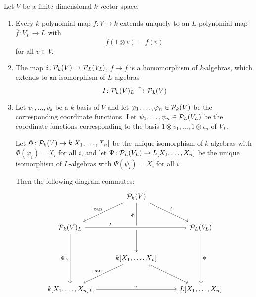 \begin{proposition}
  Let $V$ be a finite-dimensional $k$-vector space.
  \begin{enumerate}
    \item
      Every $k$-polynomial map $f \colon V \to k$ extends uniquely to an $L$-polynomial map $\overline{f} \colon V_L \to L$ with
      \[
          \overline{f}(1 \otimes v)
        = f(v)
      \]
      for all $v \in V$.
    \item
      The map $i \colon \mathcal{P}_k(V) \to \mathcal{P}_L(V_L)$, $f \mapsto \overline{f}$ is a homomorphism of $k$-algebras, which extends to an isomorphism of $L$-algebras
      \[
                            I
        \colon              \mathcal{P}_k(V)_L
        \xrightarrow{\sim}  \mathcal{P}_L(V)
      \]
    \item
      Let $v_1, \dotsc, v_n$ be a $k$-basis of $V$ and let $\varphi_1, \dotsc, \varphi_n \in \mathcal{P}_k(V)$ be the corresponding coordinate functions.
      Let $\psi_1, \dotsc, \psi_n \in \mathcal{P}_L(V_L)$ be the coordinate functions corresponding to the basis $1 \otimes v_1, \dotsc, 1 \otimes v_n$ of $V_L$.
      
      Let $\Phi \colon \mathcal{P}_k(V) \to k[X_1, \dotsc, X_n]$ be the unique isomorphism of $k$-algebras with $\Phi(\varphi_i) = X_i$ for all $i$, and let $\Psi \colon \mathcal{P}_L(V_L) \to L[X_1, \dotsc, X_n]$ be the unique isomorphism of $L$-algebras with $\Psi(\psi_i) = X_i$ for all $i$.
      
      Then the following diagram commutes:
      \begin{equation}
        \label{equaton: commuting prim}
        \begin{tikzcd}[row sep = large]
            {}
          & \mc{P}_k(V)
            \arrow{dl}[above left]{\can}
            \arrow{dr}[above right]{i}
            \arrow{dd}[near start, left]{\Phi}
          & {}
          \\
            \mc{P}_k(V)_L
            \arrow[crossing over]{rr}[near start, above]{I}
            \arrow{dd}[left]{\Phi_L}
          & {}
          & \mc{P}_L(V_L)
            \arrow{dd}[right]{\Psi}
          \\
            {}
          & k[X_1, \dotsc, X_n]
            \arrow{dl}[above left]{\can}
            \arrow[hook']{dr}
          & {}
          \\
            k[X_1, \dotsc, X_n]_L
            \arrow{rr}[above]{\sim}
          & {}
          & L[X_1, \dotsc, X_n]
        \end{tikzcd}
      \end{equation}
  \end{enumerate}
\end{proposition}



